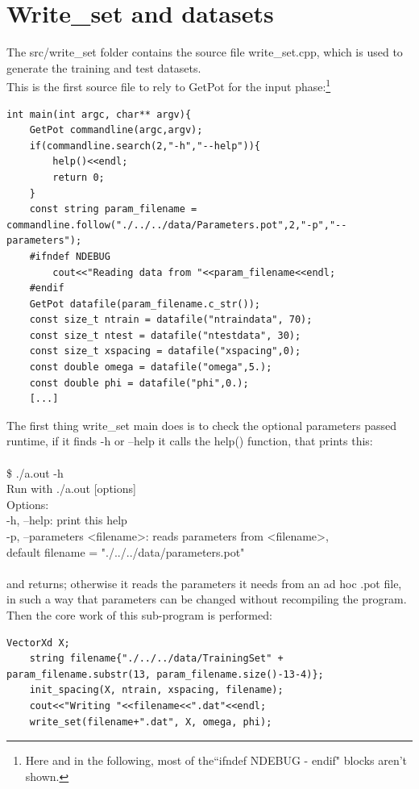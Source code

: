 \documentclass[12pt, a4paper]{report}
\theoremstyle{definition}
\begin{document}
\section{Write\_set and datasets}\label{section3.4}
The src/write\_set folder contains the source file write\_set.cpp, which is used to generate the training and test datasets.\\
This is the first source file to rely to GetPot for the input phase:\footnote{Here and in the following, most of the``{\ttfamily ifndef NDEBUG - endif}" blocks aren't shown.}
\begin{lstlisting}[frame=single, showstringspaces=false]
int main(int argc, char** argv){
	GetPot commandline(argc,argv);
	if(commandline.search(2,"-h","--help")){
		help()<<endl;
		return 0;
	}
	const string param_filename = commandline.follow("./../../data/Parameters.pot",2,"-p","--parameters");
	#ifndef NDEBUG
		cout<<"Reading data from "<<param_filename<<endl;
	#endif
	GetPot datafile(param_filename.c_str());
	const size_t ntrain = datafile("ntraindata", 70); 
	const size_t ntest = datafile("ntestdata", 30);	
	const size_t xspacing = datafile("xspacing",0); 
	const double omega = datafile("omega",5.); 
	const double phi = datafile("phi",0.);
	[...] 
\end{lstlisting}
The first thing write\_set {\ttfamily main} does is to check the optional parameters passed runtime, if it finds {\ttfamily -h} or {\ttfamily --help} it calls the  help() function, that prints this:\\
{\\\ttfamily \$ ./a.out -h  \\
Run with ./a.out [options]\\
Options:\\
-h, --help: print this help\\
-p, --parameters <filename>: reads parameters from <filename>,\\
          default filename = "./../../data/parameters.pot"\\\\}
and returns; otherwise it reads the parameters it needs from an ad hoc .pot file, in such a way that parameters can be changed without recompiling the program.
\newpage\noindent Then the core work of this sub-program is performed:
\begin{lstlisting}[frame=single, showstringspaces=false]
	VectorXd X;
	string filename{"./../../data/TrainingSet" + param_filename.substr(13, param_filename.size()-13-4)};
	init_spacing(X, ntrain, xspacing, filename);
	cout<<"Writing "<<filename<<".dat"<<endl;
	write_set(filename+".dat", X, omega, phi);
\end{lstlisting}
\end{document}
